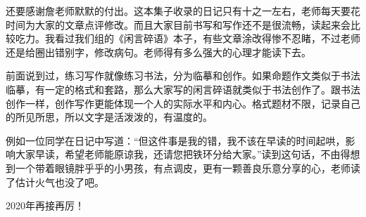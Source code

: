 还要感谢詹老师默默的付出。这本集子收录的日记只有十之一左右，老师每天要花时间为大家的文章点评修改。而且大家目前书写和写作还不是很流畅，读起来会比较吃力。我看过我们组的《闲言碎语》本子，有些文章涂改得惨不忍睹，不过老师还是给圈出错别字，修改病句。老师得有多么强大的心理才能读下去。

前面说到过，练习写作就像练习书法，分为临摹和创作。如果命题作文类似于书法临摹，有一定的格式和套路，那么大家写的闲言碎语就类似于书法创作了。跟书法创作一样，创作写作更能体现一个人的实际水平和内心。格式题材不限，记录自己的所见所思，所以文字是活泼泼的，有温度的。

例如一位同学在日记中写道：``但这件事是我的错，我不该在早读的时间起哄，影响大家早读，希望老师能原谅我，还请您把铁环分给大家。''读到这句话，不由得想到一个带着眼镜胖乎乎的小男孩，有点调皮，更有一颗善良乐意分享的心，老师读了估计火气也没了吧。

2020年再接再厉！
